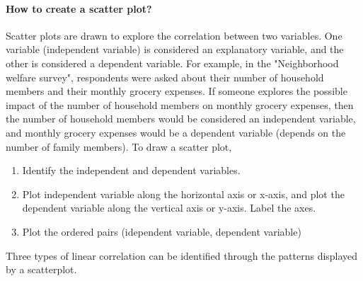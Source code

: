 \documentclass[a4paper, 11pt]{article}
\begin{document}
	\paragraph{How to create a scatter plot?}
			Scatter plots are drawn to explore the correlation between two variables. One variable (independent variable) is considered an explanatory variable, and the other is considered a dependent variable. For example, in the "Neighborhood welfare survey", respondents were asked about their number of household members and their monthly grocery expenses. If someone explores the possible impact of the number of household members on monthly grocery expenses, then the number of household members would be considered an independent variable, and monthly grocery expenses would be a dependent variable (depends on the number of family members). To draw a scatter plot,
			\begin{enumerate}[label=(\alph*), noitemsep]
			\item
			Identify the independent and dependent variables.
			\item
			Plot independent variable along the horizontal axis or x-axis, and plot the dependent variable along the vertical axis or y-axis. Label the axes.
			\item
			Plot the ordered pairs (idependent variable, dependent variable)
			\end{enumerate}
			Three types of linear correlation can be identified through the patterns displayed by a scatterplot.
\end{document}
